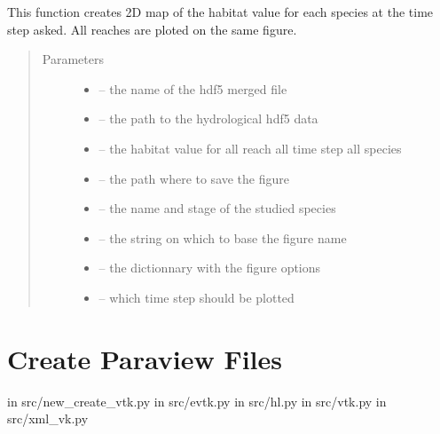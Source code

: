 \documentclass[letterpaper,10pt,english]{sphinxmanual}
\begin{document}
\begin{fulllineitems}
\label{\detokenize{index:src.calcul_hab.save_vh_fig_2d}}
This function creates 2D map of the habitat value for each species at
the time step asked. All reaches are ploted on the same figure.
\begin{quote}\begin{description}
\item[{Parameters}] \leavevmode\begin{itemize}
\item {} 
 -- the name of the hdf5 merged file

\item {} 
 -- the path to the hydrological hdf5 data

\item {} 
 -- the habitat value for all reach all time step all species

\item {} 
 -- the path where to save the figure

\item {} 
 -- the name and stage of the studied species

\item {} 
 -- the string on which to base the figure name

\item {} 
 -- the dictionnary with the figure options

\item {} 
 -- which time step should be plotted

\end{itemize}

\end{description}\end{quote}

\end{fulllineitems}



\section{Create Paraview Files}
\label{\detokenize{index:create-paraview-files}}
in src/new\_create\_vtk.py
in src/evtk.py
in src/hl.py
in src/vtk.py
in src/xml\_vk.py
\end{document}
